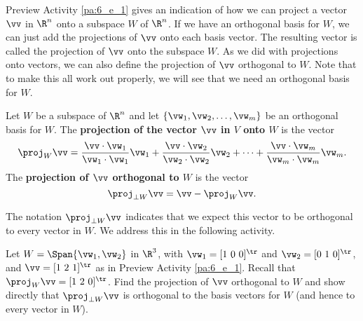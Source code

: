 \label{sec:proj_subsp_orth}

Preview Activity \ref{pa:6_e_1} gives an indication of how we can project a vector $\vv$ in $\R^n$ onto a subspace $W$ of $\R^n$. If we have an orthogonal basis for $W$, we can just add the projections of $\vv$ onto each basis vector. The resulting vector is called the projection of $\vv$ onto the subspace $W$. As we did with projections onto vectors, we can also define the projection of $\vv$ orthogonal to $W$. Note that to make this all work out properly, we will see that we need an orthogonal basis for $W$. 

\begin{definition} Let $W$ be a subspace of $\R^n$ and let $\{\vw_1, \vw_2, \ldots, \vw_m\}$ be an orthogonal basis for $W$. The \textbf{projection of the vector $\vv$ in $V$ onto $W$} is the vector
\[\proj_W \vv = \frac{\vv \cdot \vw_1}{\vw_1 \cdot \vw_1} \vw_1 + \frac{\vv \cdot \vw_2}{\vw_2 \cdot \vw_2}  \vw_2 + \cdots + \frac{\vv \cdot \vw_m}{\vw_m \cdot \vw_m}  \vw_m.\]
The \textbf{projection of $\vv$ orthogonal to $W$} is the vector
\[\proj_{\perp W} \vv = \vv - \proj_W \vv.\]
\end{definition}

The notation $\proj_{\perp W} \vv$ indicates that we expect this vector to be orthogonal to every vector in $W$. We address this in the following activity. 

\begin{activity} \label{act:6_e_orth_projection} Let $W = \Span \{\vw_1, \vw_2\}$ in $\R^3$, with $\vw_1=[1 \ 0 \ 0]^{\tr}$ and $\vw_2= [0 \ 1 \ 0]^{\tr}$,  and  $\vv = [1 \ 2 \ 1]^{\tr}$ as in Preview Activity \ref{pa:6_e_1}. Recall that $\proj_W \vv =  [1 \ 2 \ 0]^{\tr}$. Find the projection of $\vv$ orthogonal to $W$ and show directly that $\proj_{\perp W} \vv$ is orthogonal to the basis vectors for $W$ (and hence to every vector in $W$).

\end{activity}

